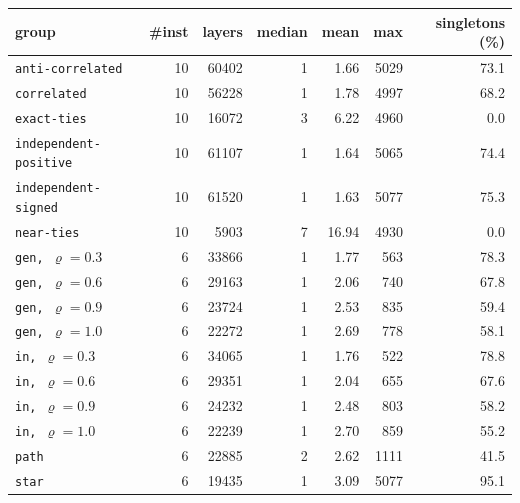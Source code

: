 \begin{tabular}{@{}lrrrrrr@{}}
\toprule
group & \#inst & layers & median & mean & max & singletons (\%) \\
\midrule
\texttt{anti-correlated} & 10 & 60402 & 1 & 1.66 & 5029 & 73.1 \\
\texttt{correlated} & 10 & 56228 & 1 & 1.78 & 4997 & 68.2 \\
\texttt{exact-ties} & 10 & 16072 & 3 & 6.22 & 4960 & 0.0 \\
\texttt{independent-positive} & 10 & 61107 & 1 & 1.64 & 5065 & 74.4 \\
\texttt{independent-signed} & 10 & 61520 & 1 & 1.63 & 5077 & 75.3 \\
\texttt{near-ties} & 10 & 5903 & 7 & 16.94 & 4930 & 0.0 \\
\texttt{gen, $\varrho=0.3$} & 6 & 33866 & 1 & 1.77 & 563 & 78.3 \\
\texttt{gen, $\varrho=0.6$} & 6 & 29163 & 1 & 2.06 & 740 & 67.8 \\
\texttt{gen, $\varrho=0.9$} & 6 & 23724 & 1 & 2.53 & 835 & 59.4 \\
\texttt{gen, $\varrho=1.0$} & 6 & 22272 & 1 & 2.69 & 778 & 58.1 \\
\texttt{in, $\varrho=0.3$} & 6 & 34065 & 1 & 1.76 & 522 & 78.8 \\
\texttt{in, $\varrho=0.6$} & 6 & 29351 & 1 & 2.04 & 655 & 67.6 \\
\texttt{in, $\varrho=0.9$} & 6 & 24232 & 1 & 2.48 & 803 & 58.2 \\
\texttt{in, $\varrho=1.0$} & 6 & 22239 & 1 & 2.70 & 859 & 55.2 \\
\texttt{path} & 6 & 22885 & 2 & 2.62 & 1111 & 41.5 \\
\texttt{star} & 6 & 19435 & 1 & 3.09 & 5077 & 95.1 \\
\bottomrule
\end{tabular}

